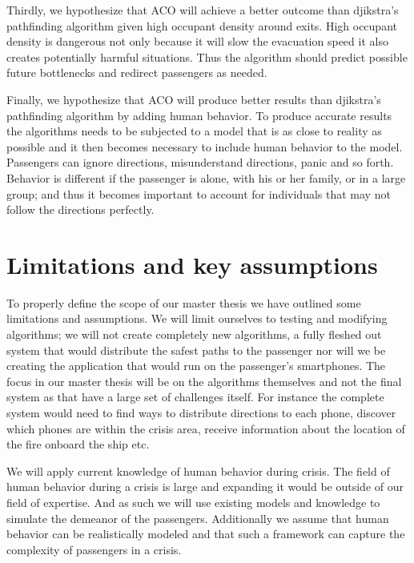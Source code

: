 Thirdly, we hypothesize that ACO will achieve a better outcome than djikstra's pathfinding algorithm
given high occupant density around exits. High occupant density is dangerous not only
because it will slow the evacuation speed it also creates potentially harmful situations. Thus the algorithm
should predict possible future bottlenecks and redirect passengers as needed.

Finally, we hypothesize that ACO will produce better results than djikstra's pathfinding algorithm                 %
by adding human behavior. To produce accurate results the algorithms needs to be subjected
to a model that is as close to reality as possible and it then becomes necessary to include
human behavior to the model. Passengers can ignore directions, misunderstand directions, panic
and so forth. Behavior is different if the passenger is alone, with his or her family, or in a large group;
and thus it becomes important to account for individuals that may not follow the directions perfectly.

\section{Limitations and key assumptions}

To properly define the scope of our master thesis we have outlined
some limitations and assumptions. We will limit ourselves to testing and modifying algorithms;
we will not create completely new algorithms, a fully fleshed out system that would distribute the %
safest paths to the passenger nor will we be creating the application that would run on the passenger's smartphones.
The focus in our master thesis will be on the algorithms themselves and not the final system as that have a large set
of challenges itself. For instance the complete system would need to find ways to distribute directions to each phone,
discover which phones are within the crisis area, receive information about the location of the fire onboard the ship etc.

We will apply current knowledge of human behavior during crisis. The field of human behavior during a crisis is large
and expanding it would be outside of our field of expertise. And as such we will use existing models and knowledge
to simulate the demeanor of the passengers. Additionally we assume that human behavior can be realistically modeled
and that such a framework can capture the complexity of passengers in a crisis.

